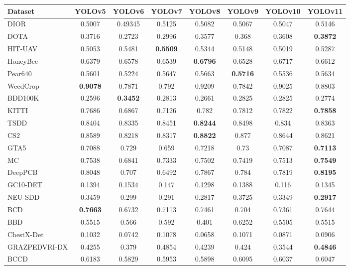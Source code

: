 \documentclass[runningheads]{llncs}
\begin{document}
\begin{table}[htbp]
\centering
\begin{tabular}{lccccccc}
\hline
Dataset & YOLOv5 & YOLOv6 & YOLOv7 & YOLOv8 & YOLOv9 & YOLOv10 & YOLOv11 \\
\hline
DIOR & 0.5007& 0.49345& 0.5125& 0.5082& 0.5067& 0.5047& 0.5146
\\
DOTA & 0.3716& 0.2723 & 0.2996 & 0.3577 & 0.368 & 0.3608 & \textbf{0.3872} \\
HIT-UAV& 0.5053 & 0.5481 & \textbf{0.5509}& 0.5344 & 0.5148 & 0.5019 & 0.5287\\
\hline
HoneyBee & 0.6379 & 0.6578 & 0.6539 & \textbf{0.6796} & 0.6528 & 0.6717 & 0.6612 \\
Pear640 & 0.5601 & 0.5224 & 0.5647 & 0.5663 & \textbf{0.5716} & 0.5536 & 0.5634 \\
WeedCrop & \textbf{0.9078} & 0.7871 & 0.792 & 0.9209 & 0.7842 & 0.9025 & 0.8803 \\
\hline
BDD100K & 0.2596 & \textbf{0.3452}& 0.2813 & 0.2661 & 0.2825 & 0.2825 & 0.2774\\
KITTI & 0.7686 & 0.6867 & 0.7126 & 0.782 & 0.7812 & 0.7822 & \textbf{0.7858} \\
TSDD & 0.8404 & 0.8335 & 0.8451 & \textbf{0.8244} & 0.8498 & 0.834 & 0.8363 \\
\hline
CS2 & 0.8589 & 0.8218 & 0.8317 & \textbf{0.8822} & 0.877 & 0.8644 & 0.8621 \\
GTA5 & 0.7088 & 0.729 & 0.659 & 0.7218 & 0.73 & 0.7087 & \textbf{0.7113} \\
MC & 0.7538 & 0.6841 & 0.7333 & 0.7502 & 0.7419 & 0.7513 & \textbf{0.7549} \\
\hline
DeepPCB & 0.8048 & 0.707 & 0.6492 & 0.7867 & 0.784 & 0.7819 & \textbf{0.8195} \\
GC10-DET & 0.1394 & 0.1534 & 0.147 & 0.1298 & 0.1388 & 0.116 & 0.1345 \\
NEU-SDD & 0.3459 & 0.299 & 0.291 & 0.2817 & 0.3725 & 0.3349 & \textbf{0.2917} \\
\hline
BCD & \textbf{0.7663} & 0.6732 & 0.7113 & 0.7461 & 0.704 & 0.7361 & 0.7644 \\
BBD & 0.5515 & 0.566 & 0.592 & 0.401 & 0.6252 & 0.5505 & 0.5515 \\
ChestX-Det & 0.1032 & 0.0742 & 0.1078 & 0.0658 & 0.1071 & 0.0871 & 0.0906 \\
GRAZPEDVRI-DX & 0.4255 & 0.379 & 0.4854 & 0.4239 & 0.424 & 0.3544 & \textbf{0.4846} \\
\hline
BCCD & 0.6183 & 0.5829 & 0.5953 & 0.5898 & 0.6095 & 0.6037 & 0.6047 \\

\end{tabular}
\end{table}
\end{document}
